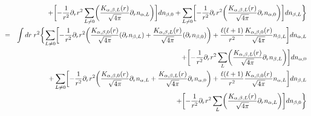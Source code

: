 \documentclass[11pt,a4paper]{report}
\begin{document}
\begin{eqnarray}
\nonumber\\
&&\hspace{1.3cm}
+\biggl[-\frac{1}{r^2}\partial_rr^2\sum_{L\neq0}\biggl(
\frac{K_{\alpha,\beta,L}(r)}{\sqrt{4\pi}} \partial_r n_{\alpha,L}
\biggr) 
\biggr]dn_{\beta,0}
+\sum_{L\neq0}\biggl[-\frac{1}{r^2}\partial_rr^2\biggl(
\frac{K_{\alpha,\beta,L}(r)}{\sqrt{4\pi}} \partial_r n_{\alpha,0}
\biggr) 
\biggr]dn_{\beta,L}
\biggr\rbrace
\nonumber\\
%
%
%
&=&\int dr\; r^2\biggl\lbrace
\sum_{L\neq0}\biggl[-\frac{1}{r^2}\partial_rr^2\biggl(
\frac{K_{\alpha,\beta,0}(r)}{\sqrt{4\pi}} (\partial_r n_{\beta,L})
+\frac{K_{\alpha,\beta,L}(r)}{\sqrt{4\pi}} (\partial_r n_{\beta,0})
\biggr) 
+
\frac{\ell(\ell+1)}{r^2}\frac{K_{\alpha,\beta,0}(r)}{\sqrt{4\pi}}n_{\beta,L}
\biggr]dn_{\alpha,L}
\nonumber\\
&&\hspace{1.3cm}
+\biggl[-\frac{1}{r^2}\partial_rr^2\sum_{L}\biggl(
\frac{K_{\alpha,\beta,L}(r)}{\sqrt{4\pi}} \partial_r n_{\beta,L}
\biggr) 
\biggr]dn_{\alpha,0}
\nonumber\\
&&\hspace{1.3cm}+\sum_{L\neq0}\biggl[-\frac{1}{r^2}\partial_rr^2\biggl(
\frac{K_{\alpha,\beta,0}(r)}{\sqrt{4\pi}} \partial_r n_{\alpha,L}
+\frac{K_{\alpha,\beta,L}(r)}{\sqrt{4\pi}} \partial_r n_{\alpha,0}
\biggr) 
+
\frac{\ell(\ell+1)}{r^2}\frac{K_{\alpha,\beta,0}(r)}{\sqrt{4\pi}}n_{\alpha,L}
\biggr]dn_{\beta,L}
\nonumber\\
&&\hspace{1.3cm}
+\biggl[-\frac{1}{r^2}\partial_rr^2\sum_{L}\biggl(
\frac{K_{\alpha,\beta,L}(r)}{\sqrt{4\pi}} \partial_r n_{\alpha,L}
\biggr) 
\biggr]dn_{\beta,0}
\biggr\rbrace
\nonumber\\
\end{eqnarray}



\clearpage
 
\end{document}
